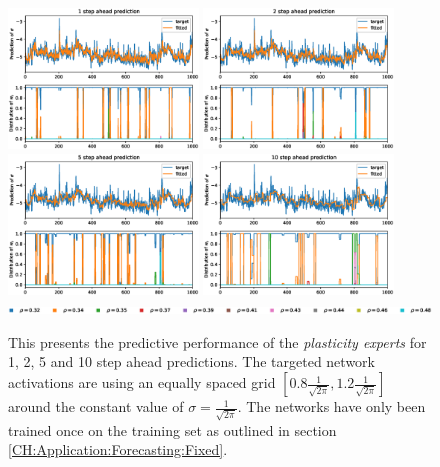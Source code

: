 \begin{figure}
    \begin{center}
        \includegraphics[width=0.45\textwidth]{Plots/Prediction/Plasticity_Grid_1step.eps}
        \includegraphics[width=0.45\textwidth]{Plots/Prediction/Plasticity_Grid_2step.eps} \\
        \includegraphics[width=0.45\textwidth]{Plots/Prediction/Plasticity_Grid_5step.eps}
        \includegraphics[width=0.45\textwidth]{Plots/Prediction/Plasticity_Grid_10step.eps} \\
        \includegraphics[width=1.0\textwidth]{Plots/Prediction/legend_Grid.eps}
        \label{FIG:PlasticityGrid}
    \end{center}
    \caption{This presents the predictive performance of the \textit{plasticity experts} for 1, 2, 5 and 10 step ahead predictions. The targeted network activations are using an equally spaced grid $\left[0.8\frac{1}{\sqrt{2\pi}}, 1.2\frac{1}{\sqrt{2\pi}}\right]$ around the constant value of $\sigma = \frac{1}{\sqrt{2\pi}}$. The networks have only been trained once on the training set as outlined in section \ref{CH:Application:Forecasting:Fixed}.}
\end{figure}

